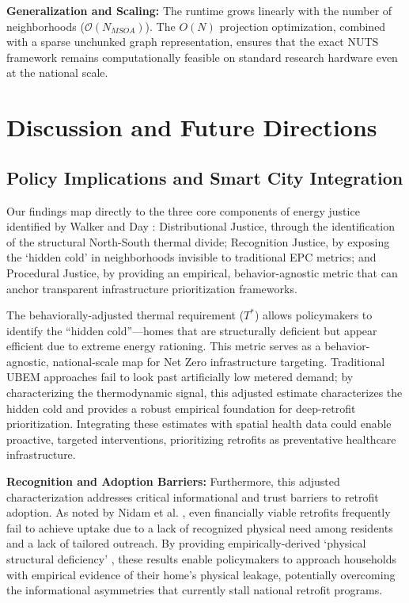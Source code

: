 \documentclass[11pt, a4paper, twocolumn, numbers]{elsarticle}
\begin{document}
\textbf{Generalization and Scaling:} The runtime grows linearly with the number of neighborhoods (\(\mathcal{O}(N_{MSOA})\)). The \(O(N)\) projection optimization, combined with a sparse unchunked graph representation, ensures that the exact NUTS framework remains computationally feasible on standard research hardware even at the national scale.

\section{Discussion and Future
Directions}\label{discussion-and-future-directions}

\subsection{Policy Implications and Smart City
Integration}\label{policy-implications-and-smart-city-integration}

Our findings map directly to the three core components of energy justice identified by Walker and Day \cite{Walker2012}: Distributional Justice, through the identification of the structural North-South thermal divide; Recognition Justice, by exposing the `hidden cold' in neighborhoods invisible to traditional EPC metrics; and Procedural Justice, by providing an empirical, behavior-agnostic metric that can anchor transparent infrastructure prioritization frameworks.

The behaviorally-adjusted thermal requirement (\(T^*\)) allows policymakers to identify the 
``hidden cold''---homes that are structurally deficient but appear 
efficient due to extreme energy rationing. This metric serves as a 
behavior-agnostic, national-scale map for Net Zero infrastructure 
targeting. Traditional UBEM approaches fail to look past artificially 
low metered demand; by characterizing the thermodynamic signal, this adjusted estimate 
characterizes the hidden cold and provides a robust empirical foundation 
for deep-retrofit prioritization. Integrating these estimates with 
spatial health data could enable proactive, targeted interventions, 
prioritizing retrofits as preventative healthcare infrastructure.

\textbf{Recognition and Adoption Barriers:} Furthermore, this adjusted characterization 
addresses critical informational and trust barriers to retrofit adoption. 
As noted by Nidam et al. \cite{Nidam2023}, even financially viable retrofits 
frequently fail to achieve uptake due to a lack of recognized physical 
need among residents and a lack of tailored outreach. By providing 
empirically-derived `physical structural deficiency' , these results enable 
policymakers to approach households with empirical evidence of their 
home's physical leakage, potentially overcoming the informational 
asymmetries that currently stall national retrofit programs.
\end{document}
